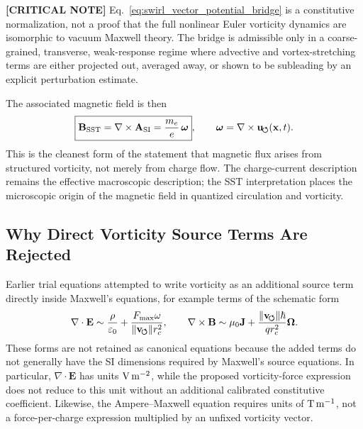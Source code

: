     \textbf{[CRITICAL NOTE]} Eq.~\eqref{eq:swirl_vector_potential_bridge} is a constitutive normalization, not a proof that the full nonlinear Euler vorticity dynamics are isomorphic to vacuum Maxwell theory. The bridge is admissible only in a coarse-grained, transverse, weak-response regime where advective and vortex-stretching terms are either projected out, averaged away, or shown to be subleading by an explicit perturbation estimate.
    
    The associated magnetic field is then
    \begin{equation}
        \boxed{
            \mathbf{B}_{\rm SST}
            =
            \nabla\times\mathbf{A}_{\rm SI}
            =
            \frac{m_e}{e}\,
            \boldsymbol{\omega}
        },
        \qquad
        \boldsymbol{\omega}
        =
        \nabla\times\mathbf{u}_{\!\boldsymbol{\circlearrowleft}}(\mathbf{x},t) .
        \label{eq:B_from_vorticity}
    \end{equation}
    This is the cleanest form of the statement that magnetic flux arises from
    structured vorticity, not merely from charge flow.  The charge-current
    description remains the effective macroscopic description; the SST
    interpretation places the microscopic origin of the magnetic field in
    quantized circulation and vorticity.

\subsection{Why Direct Vorticity Source Terms Are Rejected}
    
    Earlier trial equations attempted to write vorticity as an additional
    source term directly inside Maxwell's equations, for example terms of the
    schematic form
    \begin{equation}
        \nabla\cdot\mathbf{E}
        \sim
        \frac{\rho}{\varepsilon_0}
        +
        \frac{F_{\max}\omega}{\lVert\mathbf{v}_{\!\boldsymbol{\circlearrowleft}}\rVert r_c^2},
        \qquad
        \nabla\times\mathbf{B}
        \sim
        \mu_0\mathbf{J}
        +
        \frac{\lVert\mathbf{v}_{\!\boldsymbol{\circlearrowleft}}\rVert\hbar}{qr_c^2}\boldsymbol{\Omega}.
        \label{eq:rejected_direct_source_terms}
    \end{equation}
    These forms are not retained as canonical equations because the added
    terms do not generally have the SI dimensions required by Maxwell's
    source equations.  In particular,
    \(\nabla\cdot\mathbf{E}\) has units
    \({\rm V\,m^{-2}}\), while the proposed vorticity-force expression does
    not reduce to this unit without an additional calibrated constitutive
    coefficient.  Likewise, the Ampere--Maxwell equation requires units of
    \({\rm T\,m^{-1}}\), not a force-per-charge expression multiplied by an
    unfixed vorticity vector.
    
